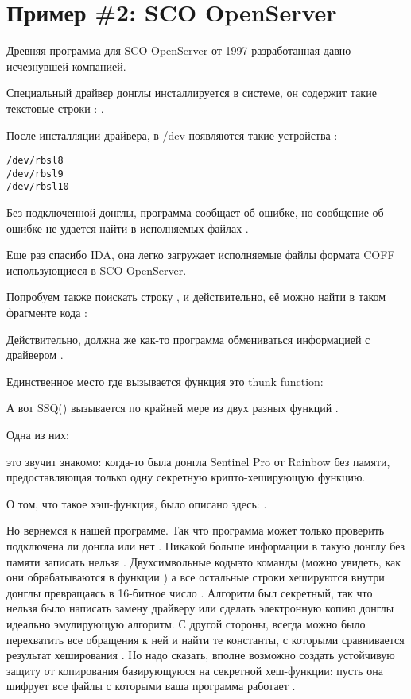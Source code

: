 \section{Пример \#2: SCO OpenServer}

\label{examples_SCO}
Древняя программа для SCO OpenServer от 1997 
разработанная давно исчезнувшей компанией.

Специальный драйвер донглы инсталлируется в системе, он содержит такие текстовые строки
:
\AndENRU
{}.

После инсталляции драйвера, в /dev появляются такие устройства
:

\begin{lstlisting}
/dev/rbsl8
/dev/rbsl9
/dev/rbsl10
\end{lstlisting}

Без подключенной донглы, программа сообщает об ошибке, но сообщение об ошибке не удается
найти в исполняемых файлах
.

Еще раз спасибо \ac{IDA}, она легко загружает исполняемые файлы формата COFF использующиеся в
 SCO OpenServer.

Попробуем также поискать строку , и действительно, её можно найти в таком фрагменте кода%
:



Действительно, должна же как-то программа обмениваться информацией с драйвером
.

Единственное место где вызывается функция 
это \gls{thunk function}:



А вот SSQ() вызывается по крайней мере из двух разных функций
.

Одна из них:



 \AndENRU {} \EMDASH{}это звучит знакомо: когда-то была донгла
 Sentinel Pro от Rainbow без памяти,
предоставляющая только одну секретную крипто-хеширующую функцию.

О том, что такое хэш-функция, было описано здесь: .

Но вернемся к нашей программе.
Так что программа может только проверить подключена ли донгла или нет
.
Никакой больше информации в такую донглу без памяти записать нельзя
.
Двухсимвольные коды\EMDASH{}это команды
(можно увидеть, как они обрабатываются в функции 
) 
а все остальные строки хешируются внутри донглы превращаясь в 16-битное число
.
Алгоритм был секретный, так что нельзя было написать замену драйверу или сделать
электронную копию донглы идеально эмулирующую алгоритм.
С другой стороны, всегда можно было перехватить все обращения к ней и найти те константы, с которыми
сравнивается результат хеширования
.
Но надо сказать, вполне возможно создать устойчивую защиту от копирования базирующуюся
на секретной хеш-функции: пусть она шифрует все файлы с которыми ваша программа работает
.


